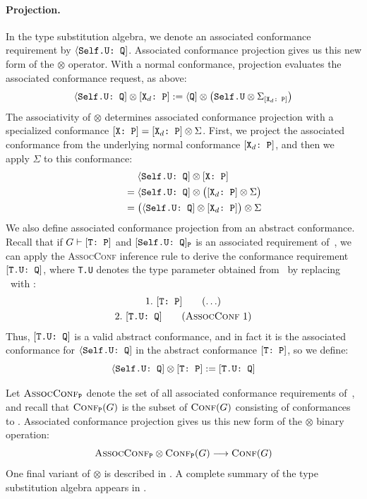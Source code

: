 \documentclass[../generics]{subfiles}
\begin{document}
\paragraph{Projection.}
In the type substitution algebra, we denote an associated conformance requirement by $\langle\texttt{Self.U:~Q}]$. Associated conformance projection gives us this new form of the $\otimes$ operator. With a normal conformance, projection evaluates the associated conformance request, as above:
\[\langle\texttt{Self.U:~Q}] \otimes [\texttt{$\texttt{X}_d$:~P}] := \langle\texttt{Q}] \otimes \big(\texttt{Self.U} \otimes \Sigma_{[\texttt{$\texttt{X}_d$:~P}]}\big)\]
The associativity of $\otimes$ determines associated conformance projection with a specialized conformance $[\texttt{X:~P}]=[\texttt{$\texttt{X}_d$:~P}]\otimes\Sigma$. First, we project the associated conformance from the underlying normal conformance $[\texttt{$\texttt{X}_d$:~P}]$, and then we apply $\Sigma$ to this conformance:
\begin{gather*}
\langle\texttt{Self.U:~Q}]\otimes[\texttt{X:~P}]\\
\qquad {} = \langle\texttt{Self.U:~Q}]\otimes\bigl([\texttt{$\texttt{X}_d$:~P}]\otimes\Sigma\bigr)\\
\qquad {} = \bigl(\langle\texttt{Self.U:~Q}]\otimes[\texttt{$\texttt{X}_d$:~P}]\bigr)\otimes\Sigma
\end{gather*}
We also define associated conformance projection from an abstract conformance. Recall that if $G\vdash[\texttt{T:~P}]$ and $[\texttt{Self.U:~Q}]_{\texttt{P}}$ is an associated requirement of~\tP, we can apply the \textsc{AssocConf} inference rule to derive the conformance requirement $[\texttt{T.U:~Q}]$, where \texttt{T.U} denotes the type parameter obtained from \SelfU\ by replacing \tSelf\ with \tT:
\begin{gather*}
\AnyStep{\TP}{1}\\
\AssocConfStep{1}{T.U}{Q}{2}
\end{gather*}
Thus, $[\texttt{T.U:~Q}]$ is a valid abstract conformance, and in fact it is the associated conformance for $\langle\texttt{Self.U:~Q}]$ in the abstract conformance $[\texttt{T:~P}]$, so we define:
\[
\langle\texttt{Self.U:~Q}] \otimes [\texttt{T:~P}] := [\texttt{T.U:~Q}]
\]

Let $\textsc{AssocConf}_{\texttt{P}}$ denote the set of all associated conformance requirements of~\tP, and recall that $\textsc{Conf}_{\texttt{P}}({G})$ is the subset of $\textsc{Conf}({G})$ consisting of conformances to \tP. Associated conformance projection gives us this new form of the \index{$\otimes$}$\otimes$ binary operation:
\[\textsc{AssocConf}_{\texttt{P}}\otimes\textsc{Conf}_{\texttt{P}}({G})\longrightarrow\textsc{Conf}({G})\]
One final variant of $\otimes$ is described in . A complete summary of the type substitution algebra appears in .
\end{document}
